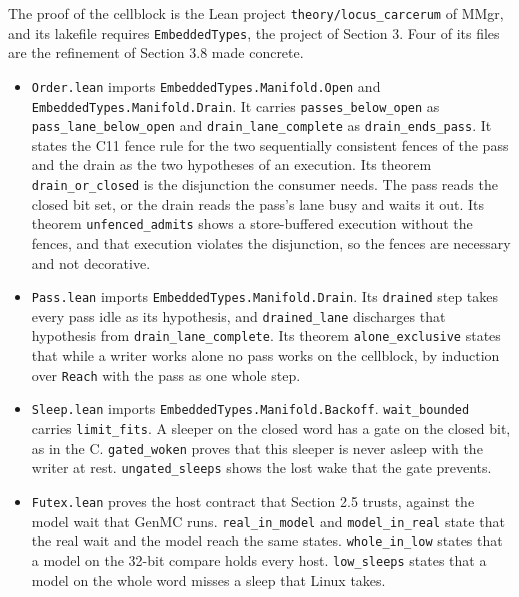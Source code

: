 The proof of the cellblock is the Lean project \texttt{theory/\allowbreak{}locus\_\allowbreak{}carcerum} of MMgr, and its lakefile requires \texttt{Embedded\allowbreak{}Types}, the project of Section 3. Four of its files are the refinement of Section 3.8 made concrete.

\begin{itemize}
\item \texttt{Order.\allowbreak{}lean} imports \texttt{Embedded\allowbreak{}Types.\allowbreak{}Manifold.\allowbreak{}Open} and \texttt{Embedded\allowbreak{}Types.\allowbreak{}Manifold.\allowbreak{}Drain}. It carries \texttt{passes\_\allowbreak{}below\_\allowbreak{}open} as \texttt{pass\_\allowbreak{}lane\_\allowbreak{}below\_\allowbreak{}open} and \texttt{drain\_\allowbreak{}lane\_\allowbreak{}complete} as \texttt{drain\_\allowbreak{}ends\_\allowbreak{}pass}. It states the C11 fence rule for the two sequentially consistent fences of the pass and the drain as the two hypotheses of an execution. Its theorem \texttt{drain\_\allowbreak{}or\_\allowbreak{}closed} is the disjunction the consumer needs. The pass reads the closed bit set, or the drain reads the pass's lane busy and waits it out. Its theorem \texttt{unfenced\_\allowbreak{}admits} shows a store-buffered execution without the fences, and that execution violates the disjunction, so the fences are necessary and not decorative.
\item \texttt{Pass.\allowbreak{}lean} imports \texttt{Embedded\allowbreak{}Types.\allowbreak{}Manifold.\allowbreak{}Drain}. Its \texttt{drained} step takes every pass idle as its hypothesis, and \texttt{drained\_\allowbreak{}lane} discharges that hypothesis from \texttt{drain\_\allowbreak{}lane\_\allowbreak{}complete}. Its theorem \texttt{alone\_\allowbreak{}exclusive} states that while a writer works alone no pass works on the cellblock, by induction over \texttt{Reach} with the pass as one whole step.
\item \texttt{Sleep.\allowbreak{}lean} imports \texttt{Embedded\allowbreak{}Types.\allowbreak{}Manifold.\allowbreak{}Backoff}. \texttt{wait\_\allowbreak{}bounded} carries \texttt{limit\_\allowbreak{}fits}. A sleeper on the closed word has a gate on the closed bit, as in the C. \texttt{gated\_\allowbreak{}woken} proves that this sleeper is never asleep with the writer at rest. \texttt{ungated\_\allowbreak{}sleeps} shows the lost wake that the gate prevents.
\item \texttt{Futex.\allowbreak{}lean} proves the host contract that Section 2.5 trusts, against the model wait that GenMC runs. \texttt{real\_\allowbreak{}in\_\allowbreak{}model} and \texttt{model\_\allowbreak{}in\_\allowbreak{}real} state that the real wait and the model reach the same states. \texttt{whole\_\allowbreak{}in\_\allowbreak{}low} states that a model on the 32-bit compare holds every host. \texttt{low\_\allowbreak{}sleeps} states that a model on the whole word misses a sleep that Linux takes.
\end{itemize}

